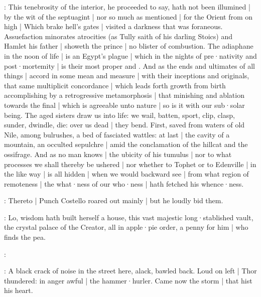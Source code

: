 :
This tenebrosity of the interior,
he proceeded to say,
hath not been illumined |
by the wit of the septuagint |
nor so much as mentioned |
for the Orient from on high |
Which brake hell's gates |
visited a darkness that was foraneous.
Assuefaction minorates atrocities
(as Tully saith of his darling Stoics)
and Hamlet his father |
showeth the prince |
no blister of combustion.
The adiaphane in the noon of life |
is an Egypt's plague |
which in the nights of pre·nativity and post·mortemity |
is their most proper  and .
And as the ends and ultimates of all things |
accord in some mean and measure |
with their inceptions and originals,
that same multiplicit concordance |
which leads forth growth from birth
accomplishing by a retrogressive metamorphosis |
that minishing and ablation towards the final |
which is agreeable unto nature |
so is it with our sub·solar being.
The aged sisters draw us into life:
we wail,
batten,
sport,
clip,
clasp,
sunder,
dwindle,
die:
over us dead |
they bend.
First,
saved from waters of old Nile,
among bulrushes,
a bed of fasciated wattles:
at last |
the cavity of a mountain,
an occulted sepulchre |
amid the conclamation of the hillcat and the ossifrage.
And as no man knows |
the ubicity of his tumulus |
nor to what processes we shall thereby be ushered |
nor whether to Tophet or to Edenville |
in the like way |
is all hidden |
when we would backward see |
from what region of remoteness |
the what·ness of our who·ness |
hath fetched his whence·ness.


:
Thereto |
Punch Costello roared out mainly  |
but he loudly bid them.

\stephen:
Lo,
wisdom hath built herself a house,
this vast majestic long·stablished vault,
the crystal palace of the Creator,
all in apple·pie order,
a penny for him |
who finds the pea.

\stephen:



:
A black crack of noise in the street here,
alack,
bawled back.
Loud on left |
Thor thundered:
in anger awful |
the hammer·hurler.
Came now the storm |
that hist his heart.

